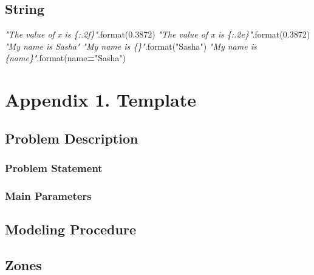 \documentclass[a4paper, nobind]{templates/ociamthesis}
\newenvironment{Shaded}{\begin{snugshade}}{\end{snugshade}}
\newcommand{\BuiltInTok}[1]{#1}
\newcommand{\CommentTok}[1]{\textcolor[rgb]{0.56,0.35,0.01}{\textit{#1}}}
\newcommand{\FloatTok}[1]{\textcolor[rgb]{0.00,0.00,0.81}{#1}}
\newcommand{\NormalTok}[1]{#1}
\newcommand{\OperatorTok}[1]{\textcolor[rgb]{0.81,0.36,0.00}{\textbf{#1}}}
\newcommand{\StringTok}[1]{\textcolor[rgb]{0.31,0.60,0.02}{#1}}
\renewenvironment{Shaded}
{
  \vspace{10pt}%
  \begin{snugshade}%
}{%
  \end{snugshade}%
  \vspace{8pt}%
}
\begin{document}
\hypertarget{string}{%
\section{String}\label{string}}

\begin{Shaded}
\begin{Highlighting}[]
\CommentTok{"The value of x is \{:.2f\}"}\NormalTok{.}\BuiltInTok{format}\NormalTok{(}\FloatTok{0.3872}\NormalTok{)}
\CommentTok{"The value of x is \{:.2e\}"}\NormalTok{.}\BuiltInTok{format}\NormalTok{(}\FloatTok{0.3872}\NormalTok{)}
\CommentTok{"My name is Sasha"}
\CommentTok{"My name is \{\}"}\NormalTok{.}\BuiltInTok{format}\NormalTok{(}\StringTok{"Sasha"}\NormalTok{)}
\CommentTok{"My name is \{name\}"}\NormalTok{.}\BuiltInTok{format}\NormalTok{(name}\OperatorTok{=}\StringTok{"Sasha"}\NormalTok{)}
\end{Highlighting}
\end{Shaded}

\startappendices

\hypertarget{appendix-1.-template}{%
\chapter{Appendix 1. Template}\label{appendix-1.-template}}

\hypertarget{problem-description-2}{%
\section{Problem Description}\label{problem-description-2}}

\hypertarget{problem-statement-2}{%
\subsection{Problem Statement}\label{problem-statement-2}}

\hypertarget{main-parameters-2}{%
\subsection{Main Parameters}\label{main-parameters-2}}

\hypertarget{modeling-procedure-2}{%
\section{Modeling Procedure}\label{modeling-procedure-2}}

\hypertarget{zones-3}{%
\section{Zones}\label{zones-3}}
\end{document}

